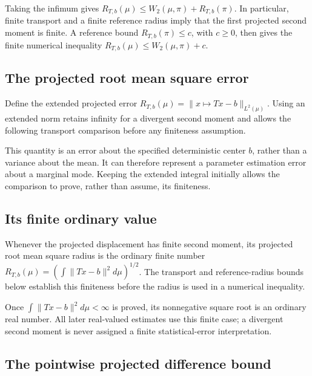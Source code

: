 \documentclass[11pt,a4paper]{report}
\begin{document}
Taking the infimum gives \(R_{T,b}(\mu)\le W_2(\mu,\pi)+R_{T,b}(\pi)\). In particular, finite transport and a finite reference radius imply that the first projected second moment is finite. A reference bound \(R_{T,b}(\pi)\le c\), with \(c\ge0\), then gives the finite numerical inequality \(R_{T,b}(\mu)\le W_2(\mu,\pi)+c\).

\subsection{\texorpdfstring{The projected root mean square error}{The projected root mean square error}}
\label{report-step-UnadjustedLangevin-Projection-lean-1}


Define the extended projected error \(R_{T,b}(\mu)=\|x\mapsto Tx-b\|_{L^2(\mu)}\). Using an extended norm retains infinity for a divergent second moment and allows the following transport comparison before any finiteness assumption.



This quantity is an error about the specified deterministic center \(b\), rather than a variance about the mean. It can therefore represent a parameter estimation error about a marginal mode. Keeping the extended integral initially allows the comparison to prove, rather than assume, its finiteness.

\subsection{\texorpdfstring{Its finite ordinary value}{Its finite ordinary value}}
\label{report-step-UnadjustedLangevin-Projection-lean-2}


Whenever the projected displacement has finite second moment, its projected root mean square radius is the ordinary finite number \(R_{T,b}(\mu)=(\int\|Tx-b\|^2d\mu)^{1/2}\). The transport and reference-radius bounds below establish this finiteness before the radius is used in a numerical inequality.



Once \(\int\|Tx-b\|^2d\mu<\infty\) is proved, its nonnegative square root is an ordinary real number. All later real-valued estimates use this finite case; a divergent second moment is never assigned a finite statistical-error interpretation.

\subsection{\texorpdfstring{The pointwise projected difference bound}{The pointwise projected difference bound}}
\label{report-step-UnadjustedLangevin-Projection-lean-3}
\end{document}
